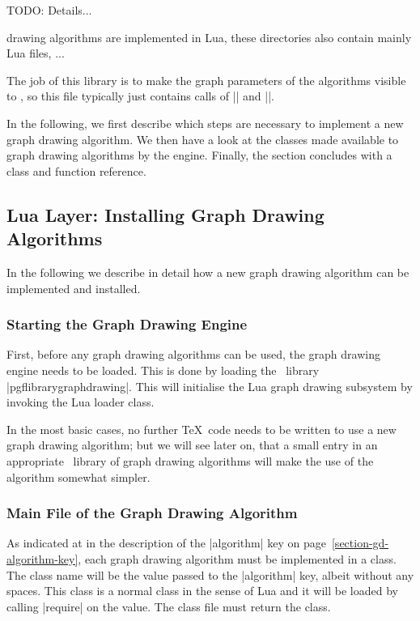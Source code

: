 TODO: Details...

drawing algorithms are implemented in Lua, these directories also
contain mainly Lua files, ...

The job of this library is to make the graph
parameters of the algorithms visible to \pgfname, so this file
typically just contains calls of |\pgfgddeclarealgorithmkey| and
|\pgfgddeclareforwardedkeys|.

In the following, we first describe which steps are necessary to
implement a new graph drawing algorithm. We then have a look at the
classes made available to graph drawing algorithms by the
engine. Finally, the section concludes with a class and function
reference.



\subsection{Lua Layer: Installing Graph Drawing Algorithms}
\label{section-gd-implementing-algorithms}

In the following we describe in detail how a new graph drawing
algorithm can be implemented and installed. 


\subsubsection{Starting the Graph Drawing Engine}

First, before any graph drawing algorithms can be used, the graph
drawing engine needs to be loaded. This is done by loading the
\pgfname\ library |pgflibrarygraphdrawing|. This will
initialise the Lua graph drawing subsystem by invoking the Lua loader
class.   

In the most basic cases, no further \TeX\ code needs to be written to
use a new graph drawing algorithm; but we will see later on, that a
small entry in an appropriate \pgfname\ library of graph drawing
algorithms will make the use of the algorithm somewhat simpler.


\subsubsection{Main File of the Graph Drawing Algorithm}

As indicated at in the description of the |algorithm| key on
page~\ref{section-gd-algorithm-key}, each graph drawing algorithm  
must be implemented in a class. The class name will be the value
passed to the |algorithm| key, albeit without any spaces. This class
is a normal class in the sense of Lua and it will be loaded by calling
|require| on the value. The class file must return the class.


